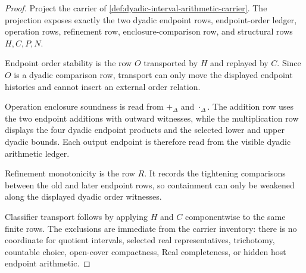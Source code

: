 \begin{proof}
Project the carrier of \autoref{def:dyadic-interval-arithmetic-carrier}. The projection exposes exactly the two dyadic endpoint rows, endpoint-order ledger, operation rows, refinement row, enclosure-comparison row, and structural rows $H,C,P,N$.

Endpoint order stability is the row $O$ transported by $H$ and replayed by $C$. Since $O$ is a dyadic comparison row, transport can only move the displayed endpoint histories and cannot insert an external order relation.

Operation enclosure soundness is read from $+_\Delta$ and $\cdot_\Delta$. The addition row uses the two endpoint additions with outward witnesses, while the multiplication row displays the four dyadic endpoint products and the selected lower and upper dyadic bounds. Each output endpoint is therefore read from the visible dyadic arithmetic ledger.

Refinement monotonicity is the row $R$. It records the tightening comparisons between the old and later endpoint rows, so containment can only be weakened along the displayed dyadic order witnesses.

Classifier transport follows by applying $H$ and $C$ componentwise to the same finite rows. The exclusions are immediate from the carrier inventory: there is no coordinate for quotient intervals, selected real representatives, trichotomy, countable choice, open-cover compactness, Real completeness, or hidden host endpoint arithmetic.
\end{proof}

